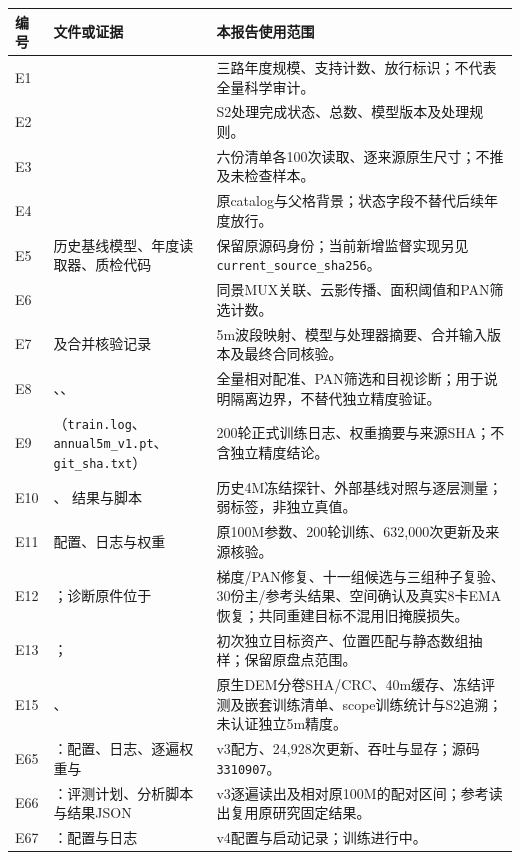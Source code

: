 \documentclass[UTF8,fontset=fandol,zihao=5,a4paper]{ctexart}
\renewcommand{\arraystretch}{1.25}
\begin{document}
\begingroup\small\renewcommand{\arraystretch}{1.1}
\noindent\begin{tabularx}{\linewidth}{@{}p{.8cm}p{5.4cm}Y@{}}
\toprule 编号 & 文件或证据 & 本报告使用范围\\\midrule
E1 &  & 三路年度规模、支持计数、放行标识；不代表全量科学审计。\\
E2 &  & S2处理完成状态、总数、模型版本及处理规则。\\
E3 &  & 六份清单各100次读取、逐来源原生尺寸；不推及未检查样本。\\
E4 &  & 原catalog与父格背景；状态字段不替代后续年度放行。\\
E5 & 历史基线模型、年度读取器、质检代码 & 保留原源码身份；当前新增监督实现另见\texttt{current\_source\_sha256}。\\
E6 &  & 同景MUX关联、云影传播、面积阈值和PAN筛选计数。\\
E7 &  及合并核验记录 & 5m波段映射、模型与处理器摘要、合并输入版本及最终合同核验。\\
E8 & 、、 & 全量相对配准、PAN筛选和目视诊断；用于说明隔离边界，不替代独立精度验证。\\
E9 & （\texttt{train.log}、\texttt{annual5m\_v1.pt}、\texttt{git\_sha.txt}） & 200轮正式训练日志、权重摘要与来源SHA；不含独立精度结论。\\
E10 & 、 结果与脚本 & 历史4M冻结探针、外部基线对照与逐层测量；弱标签，非独立真值。\\
E11 &  配置、日志与权重 & 原100M参数、200轮训练、632{,}000次更新及来源核验。\\
E12 & ；诊断原件位于 & 梯度/PAN修复、十一组候选与三组种子复验、30份主/参考头结果、空间确认及真实8卡EMA恢复；共同重建目标不混用旧掩膜损失。\\
E13 & ； & 初次独立目标资产、位置匹配与静态数组抽样；保留原盘点范围。\\
E15 & 、 & 原生DEM分卷SHA/CRC、40m缓存、冻结评测及嵌套训练清单、scope训练统计与S2追溯；未认证独立5m精度。\\
E65 & ：配置、日志、逐遍权重与 & v3配方、24,928次更新、吞吐与显存；源码\texttt{3310907}。\\
E66 & ：评测计划、分析脚本与结果JSON & v3逐遍读出及相对原100M的配对区间；参考读出复用原研究固定结果。\\
E67 & ：配置与日志 & v4配置与启动记录；训练进行中。\\\bottomrule
\end{tabularx}
\end{document}

